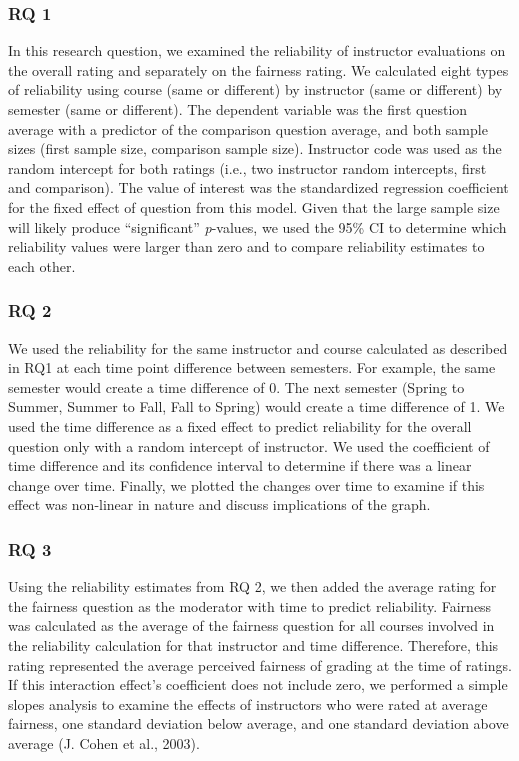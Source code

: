 \documentclass[
  man]{apa7}
\begin{document}
\hypertarget{rq-1}{%
\subsubsection{RQ 1}\label{rq-1}}

In this research question, we examined the reliability of instructor
evaluations on the overall rating and separately on the fairness rating.
We calculated eight types of reliability using course (same or
different) by instructor (same or different) by semester (same or
different). The dependent variable was the first question average with a
predictor of the comparison question average, and both sample sizes
(first sample size, comparison sample size). Instructor code was used as
the random intercept for both ratings (i.e., two instructor random
intercepts, first and comparison). The value of interest was the
standardized regression coefficient for the fixed effect of question
from this model. Given that the large sample size will likely produce
``significant'' \emph{p}-values, we used the 95\% CI to determine which
reliability values were larger than zero and to compare reliability
estimates to each other.

\hypertarget{rq-2}{%
\subsubsection{RQ 2}\label{rq-2}}

We used the reliability for the same instructor and course calculated as
described in RQ1 at each time point difference between semesters. For
example, the same semester would create a time difference of 0. The next
semester (Spring to Summer, Summer to Fall, Fall to Spring) would create
a time difference of 1. We used the time difference as a fixed effect to
predict reliability for the overall question only with a random
intercept of instructor. We used the coefficient of time difference and
its confidence interval to determine if there was a linear change over
time. Finally, we plotted the changes over time to examine if this
effect was non-linear in nature and discuss implications of the graph.

\hypertarget{rq-3}{%
\subsubsection{RQ 3}\label{rq-3}}

Using the reliability estimates from RQ 2, we then added the average
rating for the fairness question as the moderator with time to predict
reliability. Fairness was calculated as the average of the fairness
question for all courses involved in the reliability calculation for
that instructor and time difference. Therefore, this rating represented
the average perceived fairness of grading at the time of ratings. If
this interaction effect's coefficient does not include zero, we
performed a simple slopes analysis to examine the effects of instructors
who were rated at average fairness, one standard deviation below
average, and one standard deviation above average (J. Cohen et al., 2003).
\end{document}
